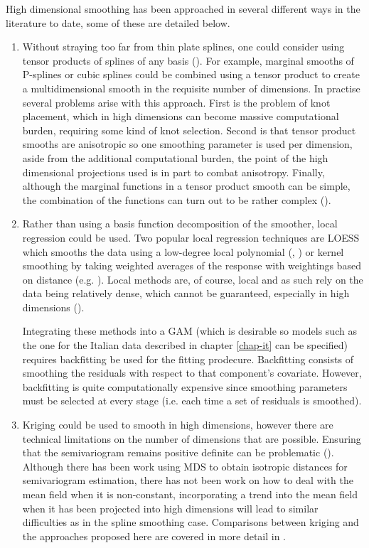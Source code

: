 High dimensional smoothing has been approached in several different ways in the literature to date, some of these are detailed below.
\begin{enumerate}
   \item Without straying too far from thin plate splines, one could consider using tensor products of splines of any basis (). For example, marginal smooths of P-splines or cubic splines could be combined using a tensor product to create a multidimensional smooth in the requisite number of dimensions. In practise several problems arise with this approach. First is the problem of knot placement, which in high dimensions can become massive computational burden, requiring some kind of knot selection. Second is that tensor product smooths are anisotropic so one smoothing parameter is used per dimension, aside from the additional computational burden, the point of the high dimensional projections used is in part to combat anisotropy. Finally, although the marginal functions in a tensor product smooth can be simple, the combination of the functions can turn out to be rather complex ().
   \item Rather than using a basis function decomposition of the smoother, local regression could be used. Two popular local regression techniques are LOESS which smooths the data using a low-degree local polynomial  (\cite{loess1}, \cite{loess2}) or kernel smoothing by taking weighted averages of the response with weightings based on distance (e.g. \cite[pp. 194-200]{elements}). Local methods are, of course, local and as such rely on the data being relatively dense, which cannot be guaranteed, especially in high dimensions (\cite[p. 200]{elements}). 

Integrating these methods into a GAM (which is desirable so models such as the one for the Italian data described in chapter \ref{chap-it} can be specified) requires backfitting be used for the fitting prodecure. Backfitting consists of smoothing the residuals with respect to that component's covariate. However, backfitting is quite computationally expensive since smoothing parameters must be selected at every stage (i.e. each time a set of residuals is smoothed).
   \item Kriging could be used to smooth in high dimensions, however there are technical limitations on the number of dimensions that are possible. Ensuring that the semivariogram remains positive definite can be problematic (\cite{boisvert}). Although there has been work using MDS to obtain isotropic distances for semivariogram estimation, there has not been work on how to deal with the mean field when it is non-constant, incorporating a trend into the mean field when it has been projected into high dimensions will lead to similar difficulties as in the spline smoothing case. Comparisons between kriging and the approaches proposed here are covered in more detail in .
\end{enumerate}

